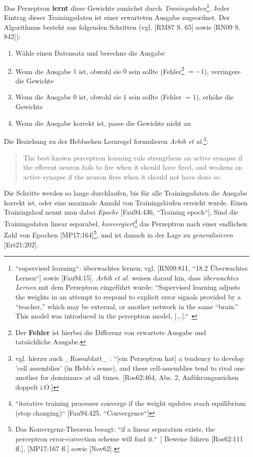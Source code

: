 Das Perzeptron \textbf{lernt} diese Gewichte zunächst durch \textit{Traningsdaten}\footnote{
    ``supervised learning``: überwachtes lernen; vgl. [RN09:811, ``18.2 Überwachtes Lernen``] sowie [Fau94:15]. \textit{Arbib et al.} weisen darauf hin, dass \textit{überwachtes Lernen} mit dem Perzeptron eingeführt wurde: ``Supervised learning adjusts the weights in an attempt to respond to explicit error signals provided by a “teacher,” which may be external, or another network in the same “brain.” This model was introduced in the perceptron model, [...].``~\cite[30]{Arb03}
}.
Jeder Eintrag dieser Trainingsdaten ist einer erwarteten Ausgabe zugeordnet. Der Algorithmus besteht aus folgenden Schritten (vgl. [RM87 S. 65] sowie [RN09 S. 842]):



\begin{enumerate}
    \item Wähle einen Datensatz und berechne die Ausgabe
    \item Wenn die Ausgabe $1$ ist, obwohl sie $0$ sein sollte (Fehler\footnote{
    Der \textbf{Fehler} ist hierbei die Differenz von $\text{erwartete Ausgabe}$ und $\text{tatsächliche Ausgabe}$.
    } $=-1$), verringere die Gewichte
    \item Wenn die Ausgabe $0$ ist, obwohl sie $1$ sein sollte  (Fehler $=1$), erhöhe die Gewichte
    \item Wenn die Ausgabe korrekt ist, passe die Gewichte nicht an
\end{enumerate}

\noindent
Die Beziehung zu der Hebbschen Lernregel formulieren \textit{Arbib et al.}\footnote{
    vgl. hierzu auch _Rosenblatt_ : ``[ein Perzeptron hat] a tendency to develop 'cell assemblies' (in Hebb's sense), and these cell-assemblies tend to rival one another for dominance at all times. [Ros62:464, Abs. 2, Anführungszeichen doppelt i.O.]
}:

\blockquote[{\cite[20]{Arb03}}]{
    The best-known perceptron learning rule strengthens an active synapse if the efferent neuron fails to fire when it should have fired, and weakens an active synapse if the neuron fires when it should not have done so.
}

\noindent
Die Schritte werden so lange durchlaufen, bis für alle Trainingsdaten die Ausgabe korrekt ist, oder eine maximale Anzahl von Trainingsläufen erreicht wurde.
Einen Trainingslauf nennt man dabei \textit{Epoche} [Fau94:436, ``Training epoch``].
Sind die Trainingsdaten linear separabel, \textit{konvergiert}\footnote{
    ``iterative training processes converge if the weight updates reach equilibrium (stop changing)`` [Fau94:425, ``Convergence``]
} das Perzeptron nach einer endlichen Zahl von Epochen [MP17:164]\footnote{
    Das Konvergenz-Theorem besagt: ``if a linear separation exists, the perceptron error-correction scheme will find it.``~\cite[20]{Arb03}] Beweise führen [Ros62:111 ff.], [MP17:167 ff.] sowie [Nov62].
}, und ist danach in der Lage zu \textit{generalisieren} [Ert21:202].\\

